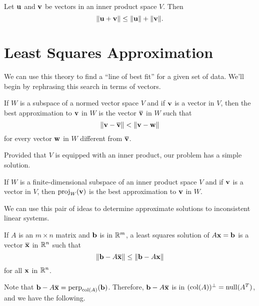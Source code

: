\documentclass[../m073main.tex]{subfiles}
\begin{document}
\begin{theorem}
	Let $\mathbf{u}$ and $\mathbf{v}$ be vectors in an inner product space $V$.
	Then
	\[ \|\mathbf{u} + \mathbf{v}\| \leq \|\mathbf{u}\| + \|\mathbf{v}\|. \]
\end{theorem}

\section{Least Squares Approximation}
We can use this theory to find a ``line of best fit'' for a given set of data.
We'll begin by rephrasing this search in terms of vectors.

\begin{definition}
	If $W$ is a subspace of a normed vector space $V$ and if $\mathbf{v}$ is a vector in $V$, then the best approximation to $\mathbf{v}$ in $W$ is the vector $\overline{\mathbf{v}}$ in $W$ such that
	\[ \|\mathbf{v} - \overline{\mathbf{v}}\| < \|\mathbf{v} - \mathbf{w}\| \]
	for every vector $\mathbf{w}$ in $W$ different from $\overline{\mathbf{v}}$.
\end{definition}

Provided that $V$ is equipped with an inner product, our problem has a simple solution.

\begin{theorem}
	If $W$ is a finite-dimensional subspace of an inner product space $V$ and if $\mathbf{v}$ is a vector in $V$, then $\operatorname{proj}_W(\mathbf{v})$ is the best approximation to $\mathbf{v}$ in $W$.
\end{theorem}

We can use this pair of ideas to determine approximate solutions to inconsistent linear systems.

\begin{definition}
	If $A$ is an $m \times n$ matrix and $\mathbf{b}$ is in $\mathbb{R}^m$, a least squares solution of $A \mathbf{x} = \mathbf{b}$ is a vector $\overline{\mathbf{x}}$ in $\mathbb{R}^n$ such that
	\[ \|\mathbf{b} - A \overline{\mathbf{x}}\| \leq \|\mathbf{b} - A \mathbf{x}\| \]
	for all $\mathbf{x}$ in $\mathbb{R}^n$.
\end{definition}

Note that $\mathbf{b} - A \overline{\mathbf{x}} = \operatorname{perp}_{\operatorname{col}(A)}(\mathbf{b})$.
Therefore, $\mathbf{b} - A \overline{\mathbf{x}}$ is in $(\operatorname{col}(A))^\perp = \operatorname{null}(A^T)$, and we have the following.
\end{document}
